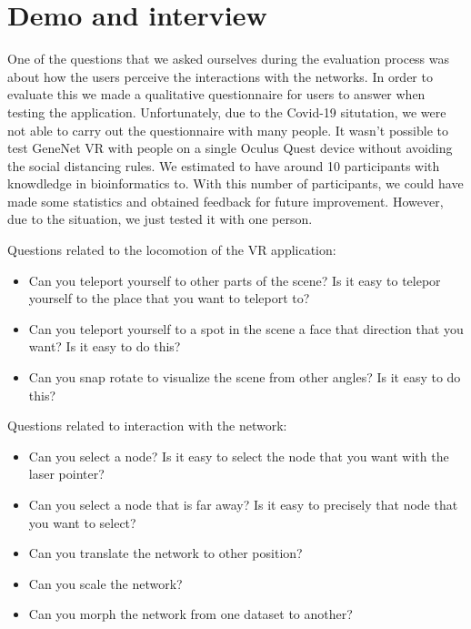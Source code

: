 \section{Demo and interview}
One of the questions that we asked ourselves during the evaluation process was about how the users perceive the interactions with the networks. In order to evaluate this we made a qualitative questionnaire for users to answer when testing the application. Unfortunately, due to the Covid-19 situtation\cite{covid_19}, we were not able to carry out the questionnaire with many people. It wasn't possible to test GeneNet VR with people on a single Oculus Quest device without avoiding the social distancing rules. We estimated to have around 10 participants with knowdledge in bioinformatics to. With this number of participants, we could have made some statistics and obtained feedback for future improvement. However, due to the situation, we just tested it with one person.

Questions related to the locomotion of the VR application:
\begin{itemize}
  \item Can you teleport yourself to other parts of the scene? Is it easy to telepor yourself to the place that you want to teleport to?
  \item Can you teleport yourself to a spot in the scene a face that direction that you want? Is it easy to do this?
  \item Can you snap rotate to visualize the scene from other angles? Is it easy to do this?
\end{itemize}

Questions related to interaction with the network:
\begin{itemize}
  \item Can you select a node? Is it easy to select the node that you want with the laser pointer?
  \item Can you select a node that is far away? Is it easy to precisely that node that you want to select?
  \item Can you translate the network to other position?
  \item Can you scale the network?
  \item Can you morph the network from one dataset to another?
\end{itemize}

%

